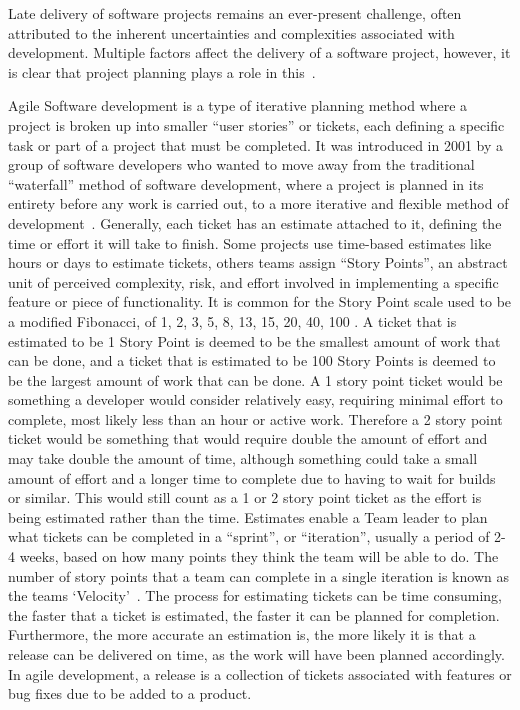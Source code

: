 \documentclass{UoYCSproject}
\begin{document}
    Late delivery of software projects remains an ever-present challenge, often attributed to the inherent uncertainties and complexities associated with development.
    Multiple factors affect the delivery of a software project, however, it is clear that project planning plays a role in this~\cite{CHOW2008961}. \par
    Agile Software development is a type of iterative planning method where a project is broken up into smaller “user stories” or tickets, each defining a specific task or part of a project that must be completed.
    It was introduced in 2001 by a group of software developers who wanted to move away from the traditional “waterfall” method of software development, where a project is planned in its entirety before any work is carried out, to a more iterative and flexible method of development~\cite{beck2001agile}.
    Generally, each ticket has an estimate attached to it, defining the time or effort it will take to finish.
    Some projects use time-based estimates like hours or days to estimate tickets, others teams assign “Story Points”, an abstract unit of perceived complexity, risk, and effort involved in implementing a specific feature or piece of functionality.
    It is common for the Story Point scale used to be a modified Fibonacci, of 1, 2, 3, 5, 8, 13, 15, 20, 40, 100 \cite{scrumFib}.
    A ticket that is estimated to be 1 Story Point is deemed to be the smallest amount of work that can be done, and a ticket that is estimated to be 100 Story Points is deemed to be the largest amount of work that can be done.
    A 1 story point ticket would be something a developer would consider relatively easy, requiring minimal effort to complete, most likely less than an hour or active work.
    Therefore a 2 story point ticket would be something that would require double the amount of effort and may take double the amount of time, although something could take a small amount of effort and a longer time to complete due to having to wait for builds or similar.
    This would still count as a 1 or 2 story point ticket as the effort is being estimated rather than the time.
    Estimates enable a Team leader to plan what tickets can be completed in a “sprint”, or “iteration”, usually a period of 2-4 weeks, based on how many points they think the team will be able to do.
    The number of story points that a team can complete in a single iteration is known as the teams `Velocity'~\cite{cohn2005agile}.
    The process for estimating tickets can be time consuming, the faster that a ticket is estimated, the faster it can be planned for completion.
    Furthermore, the more accurate an estimation is, the more likely it is that a release can be delivered on time, as the work will have been planned accordingly.
In agile development, a release is a collection of tickets associated with features or bug fixes due to be added to a product. \par
\end{document}
